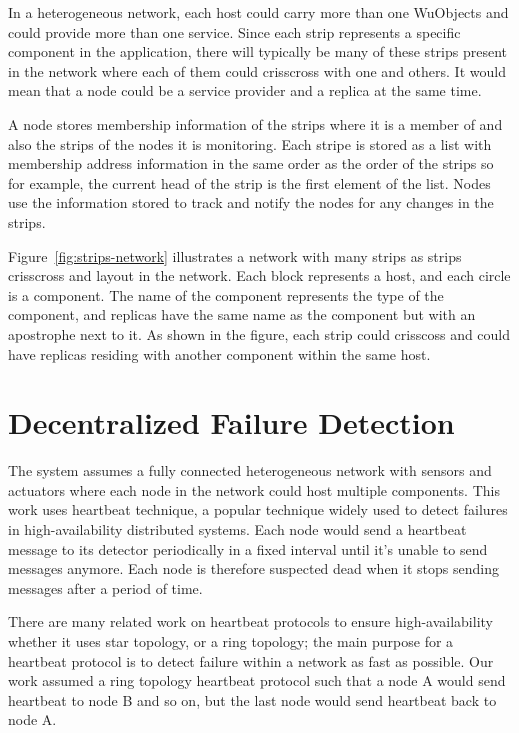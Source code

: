 In a heterogeneous network, each host could carry more than one WuObjects and
could provide more than one service. Since each strip represents a specific
component in the application, there will typically be many of these strips
present in the network where each of them could crisscross with one and others.
It would mean that a node could be a service provider and a replica at the
same time.

A node stores membership information of the strips where it is a member of and
also the strips of the nodes it is monitoring. Each stripe is stored as a list
with membership address information in the same order as the order of the
strips so for example, the current head of the strip is the first element of
the list. Nodes use the information stored to track and notify the nodes for
any changes in the strips.

Figure~\ref{fig:strips-network} illustrates a network with many strips as
strips crisscross and layout in the network. Each block represents a host, and
each circle is a component. The name of the component represents the type of
the component, and replicas have the same name as the component but with
an apostrophe next to it. As shown in the figure, each strip could crisscoss
and could have replicas residing with another component within the same host.

\section{Decentralized Failure Detection}
\label{s:dfd}

The system assumes a fully connected heterogeneous network with sensors and
actuators where each node in the network could host multiple components. This
work uses heartbeat technique, a popular technique widely used to detect
failures in high-availability distributed systems. Each node would send
a heartbeat message to its detector periodically in a fixed interval
until it's unable to send messages anymore. Each node is therefore suspected
dead when it stops sending messages after a period of time.

There are many related work on heartbeat protocols to ensure high-availability
whether it uses star topology, or a ring topology; the main purpose for
a heartbeat protocol is to detect failure within a network as fast as possible.
Our work assumed a ring topology heartbeat protocol such that a node A would
send heartbeat to node B and so on, but the last node would send heartbeat back
to node A.

